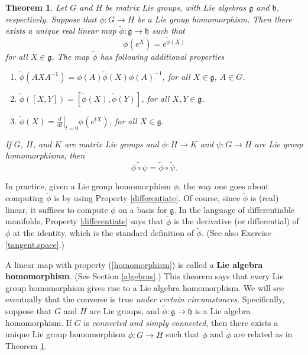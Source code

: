 \documentclass{amsbook}
\let \frak = \mathfrak
\theoremstyle{plain}
\newtheorem{theorem}{Theorem}
\numberwithin{equation}{chapter}
\numberwithin{theorem}{chapter}
\begin{document}
\begin{theorem}
\label{homo.theorem}Let $G$ and $H$ be matrix Lie groups, with Lie algebras
$\frak{g}$ and $\frak{h}$, respectively. Suppose that $\phi:G\rightarrow H$ be
a Lie group homomorphism. Then there exists a unique real linear map
$\widetilde{\phi}:\frak{g}\rightarrow\frak{h}$ such that
\[
\phi(e^{X})=e^{\widetilde{\phi}(X)}%
\]
for all $X\in\frak{g}$. The map $\widetilde{\phi}$ has following additional properties

\begin{enumerate}
\item $\widetilde{\phi}\left(  AXA^{-1}\right)  =\phi(A)\widetilde{\phi
}(X)\phi(A)^{-1}$, for all $X\in\frak{g}$, $A\in G$.

\item \label{homomorphism}$\widetilde{\phi}(\left[  X,Y\right]  )=\left[
\widetilde{\phi}(X),\widetilde{\phi}(Y)\right]  $, for all $X,Y\in\frak{g}$.

\item \label{differentiate}$\widetilde{\phi}(X)=\left.  \frac{d}{dt}\right|
_{t=0}\phi(e^{tX})$, for all $X\in\frak{g}$.
\end{enumerate}

If $G$, $H$, and $K$ are matrix Lie groups and $\phi:H\rightarrow K$ and
$\psi:G\rightarrow H$ are Lie group homomorphisms, then
\[
\widetilde{\phi\circ\psi}=\widetilde{\phi}\circ\widetilde{\psi}\text{.}%
\]
\end{theorem}

In practice, given a Lie group homomorphism $\phi$, the way one goes about
computing $\widetilde{\phi}$ is by using Property \ref{differentiate}. Of
course, since $\widetilde{\phi}$ is (real) linear, it suffices to compute
$\widetilde{\phi}$ on a basis for $\frak{g}$. In the language of
differentiable manifolds, Property \ref{differentiate} says that
$\widetilde{\phi}$ is the derivative (or differential) of $\phi$ at the
identity, which is the standard definition of $\widetilde{\phi}$. (See also
Exercise \ref{tangent.space}.)

A linear map with property (\ref{homomorphism}) is called a \textbf{Lie
algebra homomorphism}. (See Section \ref{algebras}.) This theorem says that
every Lie group homomorphism gives rise to a Lie algebra homomorphism. We will
see eventually that the converse is true \textit{under certain circumstances}.
Specifically, suppose that $G$ and $H$ are Lie groups, and $\widetilde{\phi
}:\frak{g}\rightarrow\frak{h}$ is a Lie algebra homomorphism. If $G$ is
\textit{connected and simply connected}, then there exists a unique Lie group
homomorphism $\phi:G\rightarrow H$ such that $\phi$ and $\widetilde{\phi}$ are
related as in Theorem \ref{homo.theorem}.
\end{document}
